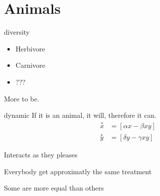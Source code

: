 \section{Animals}


\begin{frame}{diversity}
	\begin{itemize}[<+->]
		\item Herbivore
		\item Carnivore 
		\item ??? 
	\end{itemize}
	\pause[3] More to be.
\end{frame}

\begin{frame}{dynamic}
	If it is an animal, it will, therefore it can.
	\begin{eqnarray}
		\overset{*}{x} &= [\alpha x - \beta xy] \\
		\overset{*}{y} &= [\delta y - \gamma xy]
	\end{eqnarray}
	
	\pause Interacts as they pleases

	\pause Everybody get approximatly the same treatment

	\pause Some are more equal than others
\end{frame}
